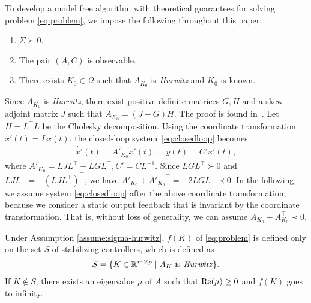 

To develop a model free algorithm with theoretical guarantees for solving problem \eqref{eq:problem}, we impose the following throughout this paper:
\begin{assumption}\label{assume:sigma-hurwitz}
  \indent
  \begin{enumerate}
    \item $\Sigma \succ 0$.
    \item The pair $(A, C)$ is observable.
    \item There exists $K_0 \in \Omega$
          such that $A_{K_0}$ is \textit{Hurwitz}
          and $K_0$ is known.
  \end{enumerate}
\end{assumption}


Since $A_{K_0}$ is \textit{Hurwitz},
there exist positive definite matrices $G, H$ and a skew-adjoint matrix $J$
such that
$
  A_{K_0} = (J-G)H.
$
The proof is found in~\cite{prajna2002lmi}.
Let $H = L^\top L$ be the Cholesky decomposition.
Using the coordinate transformation $x'(t) = Lx(t)$, the closed-loop system~\eqref{eq:closedloop} becomes
\begin{align}
  \dot{x'}(t)  = A'_{K_0}x'(t), \quad 
  y(t)         = C'x'(t),
\end{align}
where $A'_{K_0}  = LJL^\top-LGL^\top, C' = CL^{-1}$.
Since $LGL^\top\succ 0$ and $LJL^\top = -(LJL^\top)^\top$, we have
  $A'_{K_0}+{A'_{K_0}}^\top = -2LGL^\top \prec 0$.
In the following, we assume system \eqref{eq:closedloop} after the above coordinate transformation, because we consider a static output feedback that is invariant by the coordinate transformation. That is, without loss of generality, we can assume
$A_{K_0}+A_{K_0}^\top \prec 0$.

Under Assumption \ref{assume:sigma-hurwitz},
 $f(K)$ of \eqref{eq:problem} is defined only on the set $S$ of stabilizing controllers, which is defined as
\begin{align}
  S = \{K\in \mathbb{R}^{m\times p}\mid A_K\text{ is \textit{Hurwitz}}\}. \label{eq:S}
\end{align}
If $K\notin S$, there exists an eigenvalue $\mu$ of $A$ such that ${\rm Re}(\mu) \geq 0$ and $f(K)$ goes to infinity.

